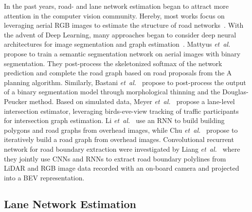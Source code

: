 \documentclass[letterpaper, 10 pt, conference]{ieeeconf}
\newcommand{\etal}{\emph{et~al.~}}
\begin{document}
In the past years, road- and lane network estimation began to attract more attention in the computer vision community. Hereby, most works focus on leveraging aerial RGB images to estimate the structure of road networks~\cite{marmanis2016semantic, mnih2010learning}. With the advent of Deep Learning, many approaches began to consider deep neural architectures for image segmentation and graph estimation~\cite{paz2015variational, bastani2018roadtracer,  chu2019neural, mattyus2017deeproadmapper, bai2018deep}. Mattyus \etal \cite{mattyus2017deeproadmapper} propose to train a semantic segmentation network on aerial images with binary segmentation. They post-process the skeletonized softmax of the network prediction and complete the road graph based on road proposals from the A planning algorithm. Similarly, Bastani \etal \cite{bastani2018roadtracer} propose to post-process the output of a binary segmentation model through morphological thinning and the Douglas-Peucker method. Based on simulated data, Meyer \etal \cite{meyer2019anytime} propose a lane-level intersection estimator, leveraging birds-eve-view tracking of traffic participants for intersection graph estimation. Li \etal \cite{li2019topological} use an RNN to build building polygons and road graphs from overhead images, while Chu \etal \cite{chu2019neural} propose to iteratively build a road graph from overhead images. Convolutional recurrent network for road boundary extraction were investigated by Liang \etal \cite{liang2019convolutional} where they jointly use CNNs and RNNs to extract road boundary polylines from LiDAR and RGB image data recorded with an on-board camera and projected into a BEV representation.



\subsection{Lane Network Estimation}
\end{document}
